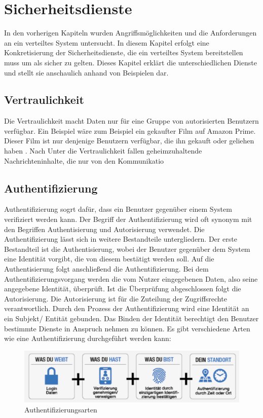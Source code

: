 \chapter{Sicherheitsdienste}\label{Sicherheitsdienste}

In den vorherigen Kapiteln wurden Angriffsmöglichkeiten und die Anforderungen an ein verteiltes System untersucht. In diesem Kapitel erfolgt eine Konkretisierung der Sicherheitsdienste, die
ein verteiltes System bereitstellen muss um als sicher zu gelten. Dieses Kapitel erklärt die unterschiedlichen Dienste und stellt sie anschaulich anhand von Beispielen dar.

\section{Vertraulichkeit}
Die Vertraulichkeit macht Daten nur für eine Gruppe von autorisierten Benutzern verfügbar. Ein Beispiel wäre zum Beispiel ein gekaufter Film auf Amazon Prime. Dieser Film ist nur denjenige
Benutzern verfügbar, die ihn gekauft oder geliehen haben \cite{Kriha.2008}. Nach \cite{}Unter die Vertraulichkeit fallen geheimzuhaltende Nachrichteninhalte, die nur von den Kommunikatio

\section{Authentifizierung}

Authentifizierung sogrt dafür, dass ein Benutzer gegenüber einem System verifiziert werden kann.
Der Begriff der Authentifizierung wird oft synonym mit den Begriffen Authentisierung und Autorisierung verwendet. 
Die Authentifizierung lässt sich in weitere Bestandteile untergliedern. Der erste Bestandteil ist die Authentisierung, 
wobei der Benutzer gegenüber dem System eine Identität vorgibt, die von diesem bestätigt werden soll. 
Auf die Authentisierung folgt anschließend die Authentifizierung. Bei dem Authentifizierungsvorgang werden die vom Nutzer 
eingegebenen Daten, also seine angegebene Identität, überprüft. Ist die Überprüfung abgeschlossen folgt die 
Autorisierung. Die Autorisierung ist für die Zuteilung der Zugriffsrechte verantwortlich. 
Durch den Prozess der Authentifizierung wird eine Identität an ein Subjekt/ Entität gebunden. 
Das Binden der Identität berechtigt den Benutzer bestimmte Dienste in Anspruch nehmen zu können. 
\newline
Es gibt verschiedene Arten wie eine Authentifizierung durchgeführt werden kann:
\begin{figure}[H]
    \centering
    \includegraphics[width=\textwidth]{images/authent_pos1.png}
    \caption[Authentifizierungsarten]{Authentifizierungsarten} 
    \label{Authentifizierungsarten}
\end{figure} 


